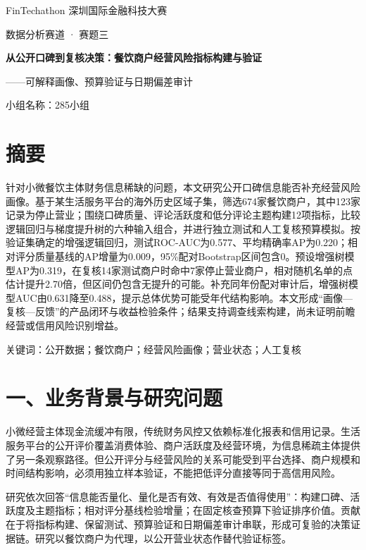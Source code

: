 \documentclass[a4paper,10pt]{article}
\renewcommand{\normalsize}{\fontsize{10.5bp}{15.75bp}\selectfont}
\begin{document}
\begin{titlepage}
\centering
\vspace*{30mm}
{\fontsize{15pt}{23pt} FinTechathon 深圳国际金融科技大赛\par}
\vspace{5mm}
{\fontsize{12pt}{18pt}\selectfont 数据分析赛道 · 赛题三\par}
\vspace{26mm}
{\fontsize{20pt}{30pt}\selectfont\bfseries 从公开口碑到复核决策：餐饮商户经营风险指标构建与验证\par}
\vspace{5mm}
{\fontsize{13pt}{21pt}\selectfont ——可解释画像、预算验证与日期偏差审计\par}
\vspace{30mm}
{\fontsize{14pt}{21pt}\selectfont 小组名称：285小组\par}
\end{titlepage}
\setcounter{page}{1}
\normalsize
\section*{摘要}
针对小微餐饮主体财务信息稀缺的问题，本文研究公开口碑信息能否补充经营风险画像。基于某生活服务平台的海外历史区域子集，筛选674家餐饮商户，其中123家记录为停止营业；围绕口碑质量、评论活跃度和低分评论主题构建12项指标，比较逻辑回归与梯度提升树的六种输入组合，并进行独立测试和人工复核预算模拟。按验证集确定的增强逻辑回归，测试ROC-AUC为0.577、平均精确率AP为0.220；相对评分质量基线的AP增量为0.009，95\%配对Bootstrap区间包含0。预设增强树模型AP为0.319，在复核14家测试商户时命中7家停止营业商户，相对随机名单的点估计提升2.70倍，但区间仍包含无提升的可能。补充同年份配对审计后，增强树模型AUC由0.631降至0.488，提示总体优势可能受年代结构影响。本文形成“画像—复核—反馈”的产品闭环与收益检验条件；结果支持调查线索构建，尚未证明前瞻经营或信用风险识别增益。

关键词：公开数据；餐饮商户；经营风险画像；营业状态；人工复核

\section*{一、业务背景与研究问题}
小微经营主体现金流缓冲有限，传统财务风控又依赖标准化报表和信用记录。生活服务平台的公开评价覆盖消费体验、商户活跃度及经营环境，为信息稀疏主体提供了另一条观察路径。但公开评分与经营风险的关系可能受到平台选择、商户规模和时间结构影响，必须用独立样本验证，不能把低评分直接等同于高信用风险。

研究依次回答“信息能否量化、量化是否有效、有效是否值得使用”：构建口碑、活跃度及主题指标；相对评分基线检验增量；在固定核查预算下验证排序价值。贡献在于将指标构建、保留测试、预算验证和日期偏差审计串联，形成可复验的决策证据链。研究以餐饮商户为代理，以公开营业状态作替代验证标签。
\end{document}
